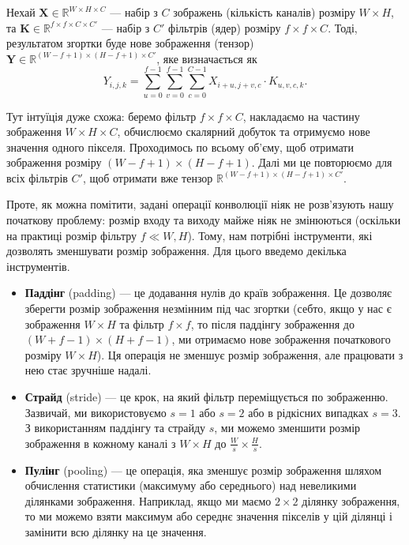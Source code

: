 \begin{definition}
    Нехай $\boldsymbol{X} \in \mathbb{R}^{W \times H \times C}$ --- набір з $C$
    зображень (кількість каналів) розміру $W \times H$, та $\boldsymbol{K} \in
    \mathbb{R}^{f \times f \times C \times C'}$ --- набір з $C'$ фільтрів (ядер)
    розміру $f \times f \times C$. Тоді, результатом згортки буде нове
    зображення (тензор) $\boldsymbol{Y} \in \mathbb{R}^{(W-f+1) \times (H-f+1)
    \times C'}$, яке визначається як
    \begin{equation}
        Y_{i,j,k} = \sum_{u=0}^{f-1} \sum_{v=0}^{f-1} \sum_{c=0}^{C-1} X_{i+u,j+v,c} \cdot K_{u,v,c,k}.
    \end{equation}
\end{definition}

Тут інтуїція дуже схожа: беремо фільтр $f \times f \times C$, накладаємо на
частину зображення $W \times H \times C$, обчислюємо скалярний добуток та
отримуємо нове значення одного пікселя. Проходимось по всьому об'єму, щоб
отримати зображення розміру $(W-f+1) \times (H-f+1)$. Далі ми це повторюємо для
всіх фільтрів $C'$, щоб отримати вже тензор $\mathbb{R}^{(W-f+1) \times (H-f+1)
\times C'}$. 


Проте, як можна помітити, задані операції конволюції ніяк не розв'язують нашу
початкову проблему: розмір входу та виходу майже ніяк не змінюються (оскільки на
практиці розмір фільтру $f \ll W,H$). Тому, нам потрібні інструменти, які
дозволять зменшувати розмір зображення. Для цього введемо декілька інструментів.
\begin{itemize}
    \item \textbf{Паддінг} (padding) --- це додавання нулів до країв зображення.
    Це дозволяє зберегти розмір зображення незмінним під час згортки (себто, 
    якщо у нас є зображення $W \times H$ та фільтр $f \times f$, то після
    паддінгу зображення до $(W+f-1) \times (H+f-1)$, ми отримаємо нове
    зображення початкового розміру $W \times H$). Ця операція не зменшує 
    розмір зображення, але працювати з нею стає зручніше надалі.
    \item \textbf{Страйд} (stride) --- це крок, на який фільтр переміщується по
    зображенню. Зазвичай, ми використовуємо $s=1$ або $s=2$ або в рідкісних
    випадках $s=3$. З використанням паддінгу та страйду $s$, ми можемо зменшити
    розмір зображення в кожному каналі з $W \times H$ до $\frac{W}{s} \times
    \frac{H}{s}$.
    \item \textbf{Пулінг} (pooling) --- це операція, яка зменшує розмір
    зображення шляхом обчислення статистики (максимуму або середнього) над
    невеликими ділянками зображення. Наприклад, якщо ми маємо $2 \times 2$
    ділянку зображення, то ми можемо взяти максимум або середнє значення
    пікселів у цій ділянці і замінити всю ділянку на це значення.
\end{itemize}

